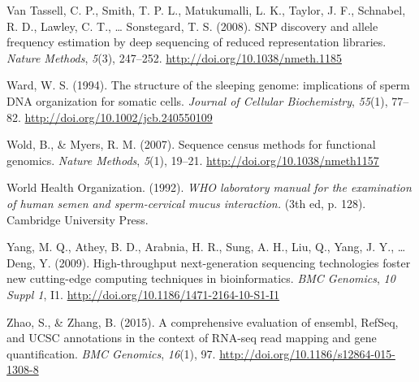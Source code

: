 \documentclass[12pt,twoside]{reedthesis}
\theoremstyle{definition}
\theoremstyle{definition}
\theoremstyle{remark}
\begin{document}
  \hypertarget{ref-VanTassell2008}{}
  Van Tassell, C. P., Smith, T. P. L., Matukumalli, L. K., Taylor, J. F.,
  Schnabel, R. D., Lawley, C. T., \ldots{} Sonstegard, T. S. (2008). SNP
  discovery and allele frequency estimation by deep sequencing of reduced
  representation libraries. \emph{Nature Methods}, \emph{5}(3), 247--252.
  \url{http://doi.org/10.1038/nmeth.1185}
  
  \hypertarget{ref-Ward1994}{}
  Ward, W. S. (1994). The structure of the sleeping genome: implications
  of sperm DNA organization for somatic cells. \emph{Journal of Cellular
  Biochemistry}, \emph{55}(1), 77--82.
  \url{http://doi.org/10.1002/jcb.240550109}
  
  \hypertarget{ref-Wold2007}{}
  Wold, B., \& Myers, R. M. (2007). Sequence census methods for functional
  genomics. \emph{Nature Methods}, \emph{5}(1), 19--21.
  \url{http://doi.org/10.1038/nmeth1157}
  
  \hypertarget{ref-WorldHealthOrganization1992}{}
  World Health Organization. (1992). \emph{WHO laboratory manual for the
  examination of human semen and sperm-cervical mucus interaction.} (3th
  ed, p. 128). Cambridge University Press.
  
  \hypertarget{ref-Yang2009}{}
  Yang, M. Q., Athey, B. D., Arabnia, H. R., Sung, A. H., Liu, Q., Yang,
  J. Y., \ldots{} Deng, Y. (2009). High-throughput next-generation
  sequencing technologies foster new cutting-edge computing techniques in
  bioinformatics. \emph{BMC Genomics}, \emph{10 Suppl 1}, I1.
  \url{http://doi.org/10.1186/1471-2164-10-S1-I1}
  
  \hypertarget{ref-Zhao2015}{}
  Zhao, S., \& Zhang, B. (2015). A comprehensive evaluation of ensembl,
  RefSeq, and UCSC annotations in the context of RNA-seq read mapping and
  gene quantification. \emph{BMC Genomics}, \emph{16}(1), 97.
  \url{http://doi.org/10.1186/s12864-015-1308-8}


\end{document}

